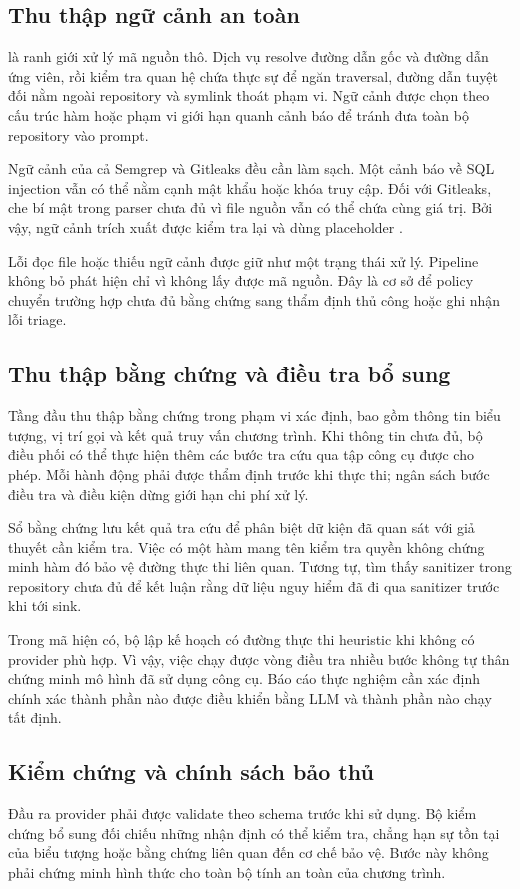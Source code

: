 \documentclass[11pt,a4paper]{article}
\newcommand{\code}[1]{{\small\texttt{\detokenize{#1}}}}
\begin{document}
\subsection{Thu thập ngữ cảnh an toàn}
\code{SafeContextService} là ranh giới xử lý mã nguồn thô. Dịch vụ resolve đường dẫn gốc và đường dẫn ứng viên, rồi kiểm tra quan hệ chứa thực sự để ngăn traversal, đường dẫn tuyệt đối nằm ngoài repository và symlink thoát phạm vi. Ngữ cảnh được chọn theo cấu trúc hàm hoặc phạm vi giới hạn quanh cảnh báo để tránh đưa toàn bộ repository vào prompt.

Ngữ cảnh của cả Semgrep và Gitleaks đều cần làm sạch. Một cảnh báo về SQL injection vẫn có thể nằm cạnh mật khẩu hoặc khóa truy cập. Đối với Gitleaks, che bí mật trong parser chưa đủ vì file nguồn vẫn có thể chứa cùng giá trị. Bởi vậy, ngữ cảnh trích xuất được kiểm tra lại và dùng placeholder \code{<REDACTED_SECRET>}.

Lỗi đọc file hoặc thiếu ngữ cảnh được giữ như một trạng thái xử lý. Pipeline không bỏ phát hiện chỉ vì không lấy được mã nguồn. Đây là cơ sở để policy chuyển trường hợp chưa đủ bằng chứng sang thẩm định thủ công hoặc ghi nhận lỗi triage.

\subsection{Thu thập bằng chứng và điều tra bổ sung}
Tầng đầu thu thập bằng chứng trong phạm vi xác định, bao gồm thông tin biểu tượng, vị trí gọi và kết quả truy vấn chương trình. Khi thông tin chưa đủ, bộ điều phối có thể thực hiện thêm các bước tra cứu qua tập công cụ được cho phép. Mỗi hành động phải được thẩm định trước khi thực thi; ngân sách bước điều tra và điều kiện dừng giới hạn chi phí xử lý.

Sổ bằng chứng lưu kết quả tra cứu để phân biệt dữ kiện đã quan sát với giả thuyết cần kiểm tra. Việc có một hàm mang tên kiểm tra quyền không chứng minh hàm đó bảo vệ đường thực thi liên quan. Tương tự, tìm thấy sanitizer trong repository chưa đủ để kết luận rằng dữ liệu nguy hiểm đã đi qua sanitizer trước khi tới sink.

Trong mã hiện có, bộ lập kế hoạch có đường thực thi heuristic khi không có provider phù hợp. Vì vậy, việc chạy được vòng điều tra nhiều bước không tự thân chứng minh mô hình đã sử dụng công cụ. Báo cáo thực nghiệm cần xác định chính xác thành phần nào được điều khiển bằng LLM và thành phần nào chạy tất định.

\subsection{Kiểm chứng và chính sách bảo thủ}
Đầu ra provider phải được validate theo schema trước khi sử dụng. Bộ kiểm chứng bổ sung đối chiếu những nhận định có thể kiểm tra, chẳng hạn sự tồn tại của biểu tượng hoặc bằng chứng liên quan đến cơ chế bảo vệ. Bước này không phải chứng minh hình thức cho toàn bộ tính an toàn của chương trình.
\end{document}
